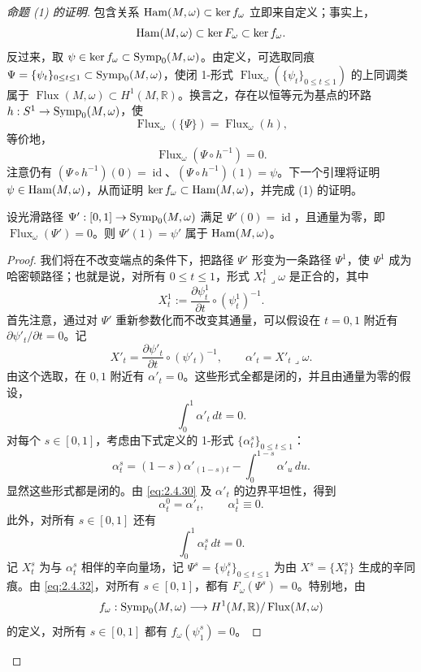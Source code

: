 \begin{proof}[命题 (1) 的证明]
包含关系 $\operatorname{Ham}(M,\omega)\subset\ker f_\omega$ 立即来自定义；事实上，
\[
  \operatorname{Ham}(M,\omega)\subset\ker F_\omega\subset\ker f_\omega.
\]
反过来，取 $\psi\in\ker f_\omega\subset\operatorname{Symp}_0(M,\omega)$。由定义，可选取同痕
$\Psi=\{\psi_t\}_{0\le t\le1}\subset\operatorname{Symp}_0(M,\omega)$，使闭 1-形式
$\operatorname{Flux}_\omega(\{\psi_t\}_{0\le t\le1})$ 的上同调类属于
$\operatorname{Flux}(M,\omega)\subset H^1(M,\mathbb R)$。换言之，存在以恒等元为基点的环路
$h:S^1\to\operatorname{Symp}_0(M,\omega)$，使
\[
  \operatorname{Flux}_\omega(\{\Psi\})
  =\operatorname{Flux}_\omega(h),
\]
等价地，
\begin{equation}
  \operatorname{Flux}_\omega(\Psi\circ h^{-1})=0.
  \label{eq:2.4.29}
\end{equation}
注意仍有
$(\Psi\circ h^{-1})(0)=\operatorname{id}$、$(\Psi\circ h^{-1})(1)=\psi$。下一个引理将证明 $\psi\in\operatorname{Ham}(M,\omega)$，从而证明
$\ker f_\omega\subset\operatorname{Ham}(M,\omega)$，并完成 (1) 的证明。

\begin{lemma}
\label{lem:zero-flux-endpoint-ham}
设光滑路径 $\Psi':[0,1]\to\operatorname{Symp}_0(M,\omega)$ 满足
$\Psi'(0)=\operatorname{id}$，且通量为零，即
$\operatorname{Flux}_\omega(\Psi')=0$。则
$\Psi'(1)=\psi'$ 属于 $\operatorname{Ham}(M,\omega)$。
\end{lemma}

\begin{proof}
我们将在不改变端点的条件下，把路径 $\Psi'$ 形变为一条路径 $\Psi^1$，使 $\Psi^1$ 成为哈密顿路径；也就是说，对所有 $0\le t\le1$，形式
$X_t^1\mathbin{\lrcorner}\omega$ 是正合的，其中
\[
  X_t^1:=\frac{\partial\psi_t^1}{\partial t}\circ(\psi_t^1)^{-1}.
\]
首先注意，通过对 $\Psi'$ 重新参数化而不改变其通量，可以假设在 $t=0,1$ 附近有
$\partial\psi'_t/\partial t=0$。记
\[
  X'_t=\frac{\partial\psi'_t}{\partial t}\circ(\psi'_t)^{-1},
  \qquad \alpha'_t=X'_t\mathbin{\lrcorner}\omega.
\]
由这个选取，在 $0,1$ 附近有 $\alpha'_t=0$。这些形式全都是闭的，并且由通量为零的假设，
\begin{equation}
  \int_0^1\alpha'_t\,dt=0.
  \label{eq:2.4.30}
\end{equation}
对每个 $s\in[0,1]$，考虑由下式定义的 1-形式 $\{\alpha_t^s\}_{0\le t\le1}$：
\[
  \alpha_t^s=(1-s)\alpha'_{(1-s)t}
  -\int_0^{1-s}\alpha'_u\,du.
\]
显然这些形式都是闭的。由 \eqref{eq:2.4.30} 及 $\alpha'_t$ 的边界平坦性，得到
\begin{equation}
  \alpha_t^0=\alpha'_t,
  \qquad \alpha_t^1\equiv0.
  \label{eq:2.4.31}
\end{equation}
此外，对所有 $s\in[0,1]$ 还有
\begin{equation}
  \int_0^1\alpha_t^s\,dt=0.
  \label{eq:2.4.32}
\end{equation}
记 $X_t^s$ 为与 $\alpha_t^s$ 相伴的辛向量场，记
$\Psi^s=\{\psi_t^s\}_{0\le t\le1}$ 为由 $X^s=\{X_t^s\}$ 生成的辛同痕。由 \eqref{eq:2.4.32}，对所有 $s\in[0,1]$，都有
$F_\omega(\Psi^s)=0$。特别地，由
\[
 f_\omega:\operatorname{Symp}_0(M,\omega)
 \longrightarrow H^1(M,\mathbb R)/\operatorname{Flux}(M,\omega)
\]
的定义，对所有 $s\in[0,1]$ 都有 $f_\omega(\psi_1^s)=0$。


\end{proof}
\end{proof}
